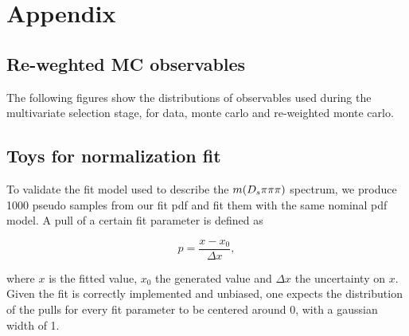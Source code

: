 \section{Appendix}
\label{sec: appendix}

\subsection{Re-weghted MC observables}
\label{sec: mcvdata}
The following figures show the distributions of observables used during the multivariate selection stage, for data, monte carlo and re-weighted monte carlo.




\subsection{Toys for normalization fit}
\label{sec: toysNorm}

To validate the fit model used to describe the $m({{D}_{s}}{\pi}{\pi}{\pi})$ spectrum, we produce 1000 pseudo samples from our fit pdf and fit them with the same nominal pdf model. \newline
A pull of a certain fit parameter is defined as

\begin{equation}
p = \frac{x - x_{0}}{\Delta x},
\label{eq: pull}
\end{equation}  

where $x$ is the fitted value, $x_{0}$ the generated value and $\Delta x$ the uncertainty on $x$. 
Given the fit is correctly implemented and unbiased, one expects the distribution of the pulls for every fit parameter to be centered around 0, with a gaussian width of 1.


